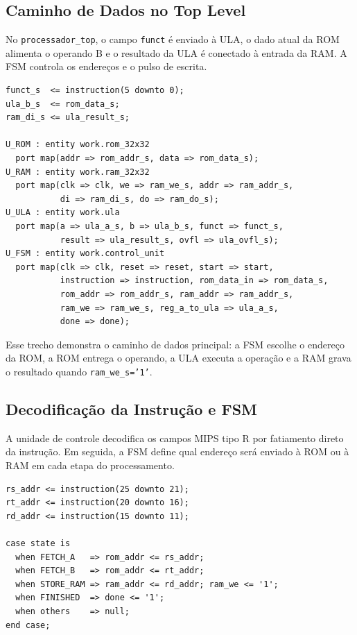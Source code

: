 \documentclass[conference]{IEEEtran}
\begin{document}
\subsection{Caminho de Dados no Top Level}
No \texttt{processador\_top}, o campo \texttt{funct} é enviado à ULA, o dado atual da ROM alimenta o operando B e o resultado da ULA é conectado à entrada da RAM. A FSM controla os endereços e o pulso de escrita.

\begin{lstlisting}[caption={Conexões principais entre ROM, ULA, RAM e FSM},label={lst:topconnect}]
funct_s  <= instruction(5 downto 0);
ula_b_s  <= rom_data_s;
ram_di_s <= ula_result_s;

U_ROM : entity work.rom_32x32
  port map(addr => rom_addr_s, data => rom_data_s);
U_RAM : entity work.ram_32x32
  port map(clk => clk, we => ram_we_s, addr => ram_addr_s,
           di => ram_di_s, do => ram_do_s);
U_ULA : entity work.ula
  port map(a => ula_a_s, b => ula_b_s, funct => funct_s,
           result => ula_result_s, ovfl => ula_ovfl_s);
U_FSM : entity work.control_unit
  port map(clk => clk, reset => reset, start => start,
           instruction => instruction, rom_data_in => rom_data_s,
           rom_addr => rom_addr_s, ram_addr => ram_addr_s,
           ram_we => ram_we_s, reg_a_to_ula => ula_a_s,
           done => done);
\end{lstlisting}

Esse trecho demonstra o caminho de dados principal: a FSM escolhe o endereço da ROM, a ROM entrega o operando, a ULA executa a operação e a RAM grava o resultado quando \texttt{ram\_we\_s='1'}.

\subsection{Decodificação da Instrução e FSM}
A unidade de controle decodifica os campos MIPS tipo R por fatiamento direto da instrução. Em seguida, a FSM define qual endereço será enviado à ROM ou à RAM em cada etapa do processamento.

\begin{lstlisting}[caption={Decodificação dos campos e ações por estado},label={lst:fsmconnect}]
rs_addr <= instruction(25 downto 21);
rt_addr <= instruction(20 downto 16);
rd_addr <= instruction(15 downto 11);

case state is
  when FETCH_A   => rom_addr <= rs_addr;
  when FETCH_B   => rom_addr <= rt_addr;
  when STORE_RAM => ram_addr <= rd_addr; ram_we <= '1';
  when FINISHED  => done <= '1';
  when others    => null;
end case;
\end{lstlisting}
\end{document}
